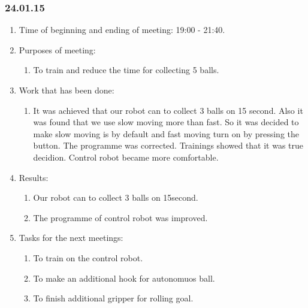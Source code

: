 \subsubsection{24.01.15}
\begin{enumerate}
	
	\item Time of beginning and ending of meeting: 19:00 - 21:40.
	
	\item Purposes of meeting:
	\begin{enumerate}
		
		\item To train and reduce the time for collecting 5 balls.
		
	\end{enumerate}

	\item Work that has been done:
	\begin{enumerate}
		
		\item It was achieved that our robot can to collect 3 balls on 15 second. Also it was found that we use slow moving more than fast. So it was decided to make slow moving is by default and fast moving turn on by pressing the button. The programme was corrected. Trainings showed that it was true decidion. Control robot became more comfortable.
		
	\end{enumerate}
	
	\item Results:
	\begin{enumerate}
		
		\item Our robot can to collect 3 balls on 15second.
		
		\item The programme of control robot was improved.
		
	\end{enumerate}
	
	\item Tasks for the next meetings:
	\begin{enumerate}
		
		\item To train on the control robot.
		
		\item To make an additional hook for autonomuos ball.
		
		\item To finish additional gripper for rolling goal.
			
	\end{enumerate}
\end{enumerate}
\fillpage
